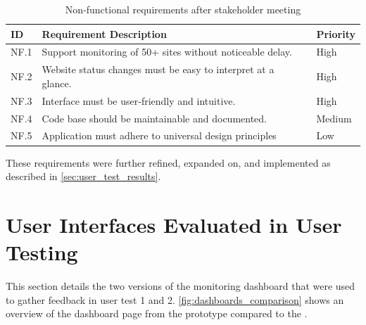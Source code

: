 \begin{table}[H]
\centering
\begin{tabular}{| l  |p{}  |l |} 
\hline
\textbf{ID} & \textbf{Requirement Description} & \textbf{Priority} \\ \hline
NF.1 & Support monitoring of 50+ sites without noticeable delay.& High \\ \hline
NF.2 & Website status changes must be easy to interpret at a glance. & High \\ \hline
NF.3 & Interface must be user‑friendly and intuitive. & High \\ \hline
NF.4 & Code base should be maintainable and documented. & Medium \\ \hline
NF.5 & Application must adhere to universal design principles & Low \\\hline
\end{tabular}
\caption{Non‑functional requirements after stakeholder meeting}
\label{tab:stakeholder_nonfunc_res}
\end{table}

These requirements were further refined, expanded on, and implemented as described in \autoref{sec:user_test_results}.



\section{User Interfaces Evaluated in User Testing}
\label{sec:artefact_snapshot}

This section details the two versions of the monitoring dashboard that were used to gather feedback in user test 1 and 2. \autoref{fig:dashboards_comparison} shows an overview of the dashboard page from the prototype compared to the .


